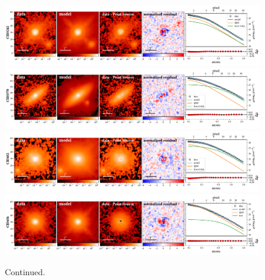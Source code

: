 \documentclass[apj]{emulateapj}
\begin{document}
\begin{figure}
\centering
{
\includegraphics[height=0.25\textwidth]{fig/best_fit_CID3242_SB_profile.pdf}
\includegraphics[height=0.25\textwidth]{fig/best_fit_CID3570_SB_profile.pdf}
\includegraphics[height=0.25\textwidth]{fig/best_fit_CID452_SB_profile.pdf}
\includegraphics[height=0.25\textwidth]{fig/best_fit_CID454_SB_profile.pdf}
}
\caption{Continued.}
\end{figure} 
\end{document}
